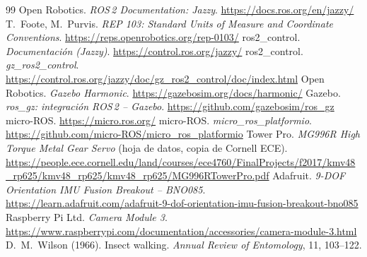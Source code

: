 \documentclass[11pt,a4paper]{article}
\begin{document}
\begin{thebibliography}{99}\small
{} Open Robotics. \emph{ROS\,2 Documentation: Jazzy}. \url{https://docs.ros.org/en/jazzy/}
 T.~Foote, M.~Purvis. \emph{REP 103: Standard Units of Measure and Coordinate Conventions}. \url{https://reps.openrobotics.org/rep-0103/}
 ros2\_control. \emph{Documentación (Jazzy)}. \url{https://control.ros.org/jazzy/}
 ros2\_control. \emph{gz\_ros2\_control}. \url{https://control.ros.org/jazzy/doc/gz_ros2_control/doc/index.html}
 Open Robotics. \emph{Gazebo Harmonic}. \url{https://gazebosim.org/docs/harmonic/}
 Gazebo. \emph{ros\_gz: integración ROS\,2 – Gazebo}. \url{https://github.com/gazebosim/ros_gz}
 micro-ROS. \url{https://micro.ros.org/}
 micro-ROS. \emph{micro\_ros\_platformio}. \url{https://github.com/micro-ROS/micro_ros_platformio}
 Tower Pro. \emph{MG996R High Torque Metal Gear Servo} (hoja de datos, copia de Cornell ECE). \url{https://people.ece.cornell.edu/land/courses/ece4760/FinalProjects/f2017/kmv48_rp625/kmv48_rp625/kmv48_rp625/MG996RTowerPro.pdf}
 Adafruit. \emph{9-DOF Orientation IMU Fusion Breakout -- BNO085}. \url{https://learn.adafruit.com/adafruit-9-dof-orientation-imu-fusion-breakout-bno085}
 Raspberry Pi Ltd. \emph{Camera Module 3}. \url{https://www.raspberrypi.com/documentation/accessories/camera-module-3.html}
 D.~M.~Wilson (1966). Insect walking. \emph{Annual Review of Entomology}, 11, 103--122.
\end{thebibliography}
\end{document}
